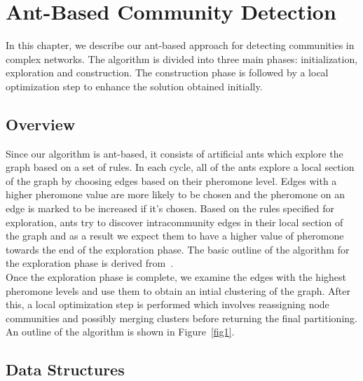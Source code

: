 \chapter{Ant-Based Community Detection}
\begin{spacing}{1.5}
In this chapter, we describe our ant-based approach for detecting communities in complex networks. The algorithm is divided into three main phases: initialization, exploration and construction. The construction phase is followed by a local optimization step to enhance the solution obtained initially.

\section{Overview}

Since our algorithm is ant-based, it consists of artificial ants which explore the graph based on a set of rules. In each cycle, all of the ants explore a local section of the graph by choosing edges based on their pheromone level. Edges with a higher pheromone value are more likely to be chosen and the pheromone on an edge is marked to be increased if it's chosen. Based on the rules specified for exploration, ants try to discover intracommunity edges in their local section of the graph and as a result we expect them to have a higher value of pheromone towards the end of the exploration phase. The basic outline of the algorithm for the exploration phase is derived from~\cite{5910378}.  \\
\indent Once the exploration phase is complete, we examine the edges with the highest pheromone levels and use them to obtain an intial clustering of the graph. After this, a local optimization step is performed which involves reassigning node communities and possibly merging clusters before returning the final partitioning. An outline of the algorithm is shown in Figure~\ref{fig1}.


\section{Data Structures}


\end{spacing}
